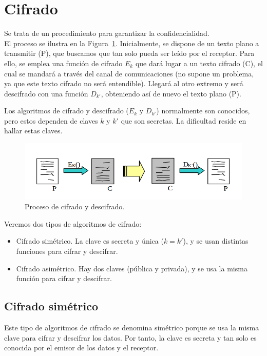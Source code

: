 \section{Cifrado}
Se trata de un procedimiento para garantizar la confidencialidad.\\


El proceso se ilustra en la Figura~\ref{fig:cifrado/descifrado}. Inicialmente, se dispone de un texto plano a transmitir (P), que buscamos que tan solo pueda ser leído por el receptor. Para ello, se emplea una función de cifrado $E_k$ que dará lugar a un texto cifrado (C), el cual se mandará a través del canal de comunicaciones (no supone un problema, ya que este texto cifrado no será entendible). Llegará al otro extremo y será descifrado con una función $D_{k'}$, obteniendo así de nuevo el texto plano (P).

Los algoritmos de cifrado y descifrado ($E_k$ y $D_{k'}$) normalmente son conocidos, pero estos dependen de claves $k$ y $k'$ que son secretas. La dificultad reside en hallar estas claves.
\begin{figure}
    \centering
    \includegraphics[width=1\linewidth]{./images/cifrado.png}
    \caption{Proceso de cifrado y descifrado.}
    \label{fig:cifrado/descifrado}
\end{figure}

Veremos dos tipos de algoritmos de cifrado:
\begin{itemize}
    \item Cifrado simétrico. La clave es secreta y única ($k=k'$), y se usan distintas funciones para cifrar y descifrar.
    \item Cifrado asimétrico. Hay dos claves (pública y privada), y se usa la misma función para cifrar y descifrar.
\end{itemize}

\subsection{Cifrado simétrico}

Este tipo de algoritmos de cifrado se denomina simétrico porque se usa la misma clave para cifrar y descifrar los datos. Por tanto, la clave es secreta y tan solo es conocida por el emisor de los datos y el receptor.

